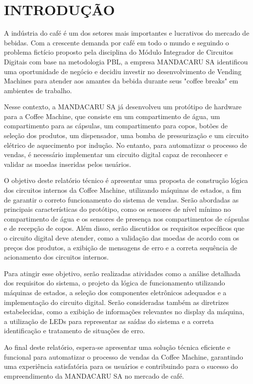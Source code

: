 \chapter{INTRODUÇÃO}

A indústria do café é um dos setores mais importantes e lucrativos do mercado de bebidas. Com a crescente demanda por café em todo o mundo e seguindo o problema fictício proposto pela disciplina do Módulo Integrador de Circuitos Digitais com base na metodologia PBL, a empresa MANDACARU SA identificou uma oportunidade de negócio e decidiu investir no desenvolvimento de Vending Machines para atender aos amantes da bebida durante seus "coffee breaks" em ambientes de trabalho.

Nesse contexto, a MANDACARU SA já desenvolveu um protótipo de hardware para a Coffee Machine, que consiste em um compartimento de água, um compartimento para as cápsulas, um compartimento para copos, botões de seleção dos produtos, um dispensador, uma bomba de pressurização e um circuito elétrico de aquecimento por indução. No entanto, para automatizar o processo de vendas, é necessário implementar um circuito digital capaz de reconhecer e validar as moedas inseridas pelos usuários.

O objetivo deste relatório técnico é apresentar uma proposta de construção lógica dos circuitos internos da Coffee Machine, utilizando máquinas de estados, a fim de garantir o correto funcionamento do sistema de vendas. Serão abordadas as principais características do protótipo, como os sensores de nível mínimo no compartimento de água e os sensores de presença nos compartimentos de cápsulas e de recepção de copos. Além disso, serão discutidos os requisitos específicos que o circuito digital deve atender, como a validação das moedas de acordo com os preços dos produtos, a exibição de mensagens de erro e a correta sequência de acionamento dos circuitos internos.

Para atingir esse objetivo, serão realizadas atividades como a análise detalhada dos requisitos do sistema, o projeto da lógica de funcionamento utilizando máquinas de estados, a seleção dos componentes eletrônicos adequados e a implementação do circuito digital. Serão consideradas também as diretrizes estabelecidas, como a exibição de informações relevantes no display da máquina, a utilização de LEDs para representar as saídas do sistema e a correta identificação e tratamento de situações de erro.

Ao final deste relatório, espera-se apresentar uma solução técnica eficiente e funcional para automatizar o processo de vendas da Coffee Machine, garantindo uma experiência satisfatória para os usuários e contribuindo para o sucesso do empreendimento da MANDACARU SA no mercado de café.

